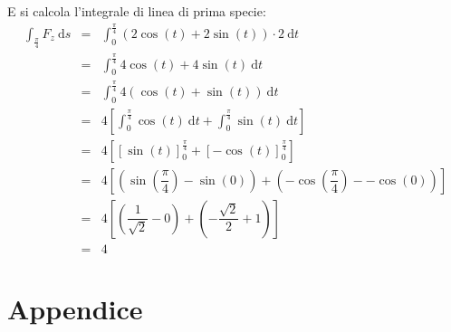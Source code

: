 \documentclass[a4paper]{article}
\begin{document}
	\noindent
	E si calcola l'integrale di linea di prima specie:
	\begin{equation*}
		\begin{array}{rcl}
			\displaystyle\int_{\frac{\pi}{4}} F_{z} \:\mathrm{d}s
			&=&
			\displaystyle\int_{0}^{\frac{\pi}{4}} \left(2\cos\left(t\right) + 2\sin\left(t\right)\right) \cdot 2 \:\mathrm{d}t \\ [1.5em]
			&=&
			\displaystyle\int_{0}^{\frac{\pi}{4}} 4\cos\left(t\right) + 4\sin\left(t\right) \:\mathrm{d}t \\ [1.5em]
			&=&
			\displaystyle\int_{0}^{\frac{\pi}{4}} 4\left(\cos\left(t\right) + \sin\left(t\right)\right) \:\mathrm{d}t \\ [1.5em]
			&=&
			4\left[\displaystyle\int_{0}^{\frac{\pi}{4}} \cos\left(t\right) \:\mathrm{d}t + \displaystyle\int_{0}^{\frac{\pi}{4}} \sin\left(t\right) \:\mathrm{d}t\right] \\ [1.5em]
			&=&
			4\left[\left[\sin\left(t\right)\right]_{0}^{\frac{\pi}{4}} + \left[-\cos\left(t\right)\right]_{0}^{\frac{\pi}{4}}\right] \\ [1.5em]
			&=&
			4\left[\left(\sin\left(\dfrac{\pi}{4}\right) - \sin\left(0\right)\right) + \left(-\cos\left(\dfrac{\pi}{4}\right) - -\cos\left(0\right)\right)\right] \\ [1.5em]
			&=&
			4\left[\left(\dfrac{1}{\sqrt{2}} - 0\right) + \left(-\dfrac{\sqrt{2}}{2} + 1\right)\right] \\ [1.5em]
			&=& 4
		\end{array}
	\end{equation*}
	

	\newpage
	\newpage
	\newpage
	\section{Appendice}
\end{document}
